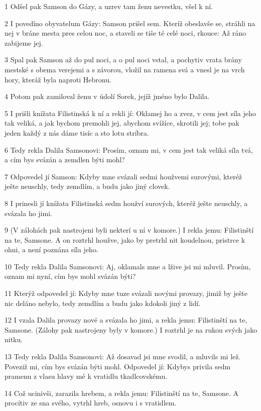 \par 1 Odšel pak Samson do Gázy, a uzrev tam ženu nevestku, všel k ní.
\par 2 I povedíno obyvatelum Gázy: Samson prišel sem. Kteríž obeslavše se, stráhli na nej v bráne mesta pres celou noc, a staveli se tiše té celé noci, rkouce: Až ráno zabijeme jej.
\par 3 Spal pak Samson až do pul noci, a o pul noci vstal, a pochytiv vrata brány mestské s obema verejemi a s závorou, vložil na ramena svá a vnesl je na vrch hory, kteráž byla naproti Hebronu.
\par 4 Potom pak zamiloval ženu v údolí Sorek, jejíž jméno bylo Dalila.
\par 5 I prišli knížata Filistinská k ní a rekli jí: Oklamej ho a zvez, v cem jest síla jeho tak veliká, a jak bychom premohli jej, abychom svížíce, skrotili jej; tobe pak jeden každý z nás dáme tisíc a sto lotu stríbra.
\par 6 Tedy rekla Dalila Samsonovi: Prosím, oznam mi, v cem jest tak veliká síla tvá, a cím bys svázán a zemdlen býti mohl?
\par 7 Odpovedel jí Samson: Kdyby mne svázali sedmi houžvemi surovými, kteréž ješte neuschly, tedy zemdlím, a budu jako jiný clovek.
\par 8 I prinesli jí knížata Filistinská sedm houžví surových, kteréž ješte neuschly, a svázala ho jimi.
\par 9 (V zálohách pak nastrojeni byli nekterí u ní v komore.) I rekla jemu: Filistinští na te, Samsone. A on roztrhl houžve, jako by pretrhl nit koudelnou, pristrce k ohni, a není poznána síla jeho.
\par 10 Tedy rekla Dalila Samsonovi: Aj, oklamals mne a lžive jsi mi mluvil. Prosím, oznam mi nyní, cím bys mohl svázán býti?
\par 11 Kterýž odpovedel jí: Kdyby mne tuze svázali novými provazy, jimiž by ješte nic deláno nebylo, tedy zemdlím a budu jako kdokoli jiný z lidí.
\par 12 I vzala Dalila provazy nové a svázala ho jimi, a rekla jemu: Filistinští na te, Samsone. (Zálohy pak nastrojeny byly v komore.) I roztrhl je na rukou svých jako nitku.
\par 13 Tedy rekla Dalila Samsonovi: Až dosavad jsi mne svodil, a mluvils mi lež. Poveziž mi, cím bys svázán býti mohl. Odpovedel jí: Kdybys privila sedm pramenu z vlasu hlavy mé k vratidlu tkadlcovskému.
\par 14 Což ucinivši, zarazila hrebem, a rekla jemu: Filistinští na te, Samsone. A procítiv ze sna svého, vytrhl hreb, osnovu i s vratidlem.
